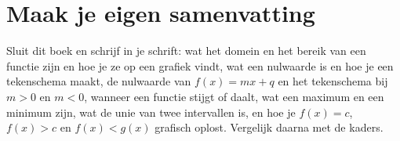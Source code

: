 \begin{oefeningen}
























\end{oefeningen}


\begin{oefeningen}






\end{oefeningen}


\ifzelfstudie
\section*{Maak je eigen samenvatting}
Sluit dit boek en schrijf in je schrift: wat het domein en het bereik van een functie zijn en hoe je ze op een grafiek vindt, wat een nulwaarde is en hoe je een tekenschema maakt, de nulwaarde van $f(x) = mx + q$ en het tekenschema bij $m > 0$ en $m < 0$, wanneer een functie stijgt of daalt, wat een maximum en een minimum zijn, wat de unie van twee intervallen is, en hoe je $f(x) = c$, $f(x) > c$ en $f(x) < g(x)$ grafisch oplost. Vergelijk daarna met de kaders.
\fi
